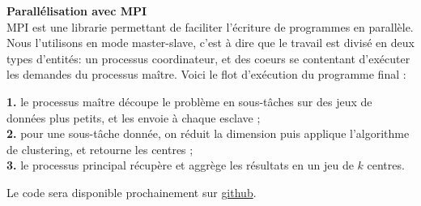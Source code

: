 \documentclass[12pt]{article}
\begin{document}
\noindent \textbf{Parallélisation avec MPI}\\
MPI est une librarie permettant de faciliter l'écriture de programmes en parallèle. 
Nous l'utilisons en mode master-slave, c'est à dire que le travail est divisé en deux types d'entités: un processus coordinateur, 
et des coeurs se contentant d'exécuter les demandes du processus maître. 
Voici le flot d'exécution du programme final :\\
\begin{addmargin}[1em]{2em}%
\noindent \textbf{1.} le processus maître découpe le problème en sous-tâches sur des jeux de données plus petits, et les envoie à chaque esclave ;\\
\textbf{2.} pour une sous-tâche donnée, on réduit la dimension puis applique l'algorithme de clustering, et retourne les centres ;\\
\textbf{3.} le processus principal récupère et aggrège les résultats en un jeu de $k$ centres.\\
\end{addmargin}
Le code sera disponible prochainement sur \href{https://github.com/}{github}.
\end{document}
